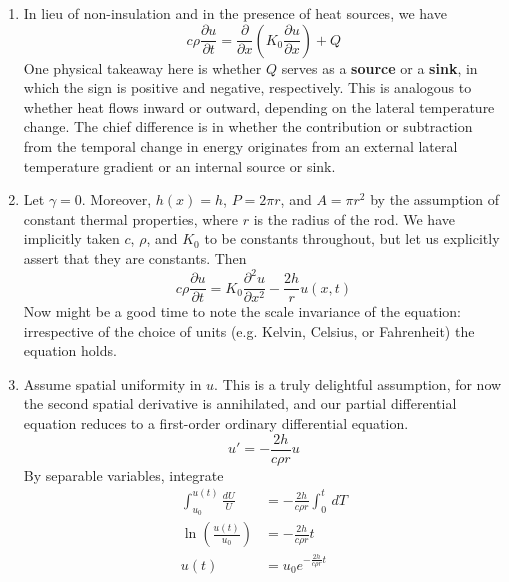 \documentclass[a4paper]{article}
\begin{document}
\begin{enumerate}[label=(\alph*)]
	\[
		c \rho \frac{\partial u}{\partial t} = \frac{\partial }{\partial x}\!\left( K_{0} \frac{\partial u}{\partial x} \right) - \frac{P}{A}\!\left[ u \!\left( x,t \right) - \gamma \!\left( x,t \right) \right]h \!\left( x \right) 
	\]
	Since \( h \!\left( x \right) \) is positive, we need not worry about dealing with sign alterations on that last term. Physically, suppose that \( u > \gamma \). Then the outside temperature is cooler, so heat transfer is in the opposite direction of the temperature gradient (from the rod to the outside), hence the final term is negative. In the converse direction when \( u < \gamma \), heat flows from the outside to the rod, and the final term is positive. At equality, the final term vanishes, and whether or not the lateral surface area is insulated becomes irrelevant in this special case.
	\item In lieu of non-insulation and in the presence of heat sources, we have
	\[
		c \rho \frac{\partial u}{\partial t} = \frac{\partial }{\partial x}\!\left( K_{0}\frac{\partial u}{\partial x} \right) + Q 
	\]
	One physical takeaway here is whether \( Q \) serves as a \textbf{source} or a \textbf{sink}, in which the sign is positive and negative, respectively. This is analogous to whether heat flows inward or outward, depending on the lateral temperature change. The chief difference is in whether the contribution or subtraction from the temporal change in energy originates from an external lateral temperature gradient or an internal source or sink.
	\item Let \( \gamma = 0 \). Moreover, \( h \!\left( x \right) = h \), \( P = 2 \pi r \), and \( A = \pi r^{2} \) by the assumption of constant thermal properties, where \( r \) is the radius of the rod. We have implicitly taken \( c \), \( \rho \), and \( K_{0} \) to be constants throughout, but let us explicitly assert that they are constants. Then
	\[
		c \rho \frac{\partial u}{\partial t} = K_{0}\frac{\partial^{2}u}{\partial x^{2}} - \frac{2h}{r}u \!\left( x,t \right)
	\]
	Now might be a good time to note the scale invariance of the equation: irrespective of the choice of units (e.g. Kelvin, Celsius, or Fahrenheit) the equation holds.
	\item Assume spatial uniformity in \( u \). This is a truly delightful assumption, for now the second spatial derivative is annihilated, and our partial differential equation reduces to a first-order ordinary differential equation.
	\[
		u' = -\frac{2h}{c \rho r}u 
	\]
	By separable variables, integrate
	\begin{align*}
		\int^{u \!\left( t \right)}_{u_{0}} \frac{dU}{U} & = -\frac{2h}{c \rho r}\int^{t}_{0}  \, dT \\
		\ln\!\left(\frac{u \!\left( t \right)}{u_{0}}\right) & = -\frac{2h}{c \rho r}t \\
		u \!\left( t \right) & = u_{0}e^{-\frac{2h}{c \rho r}t}
	\end{align*}
\end{enumerate}
\end{document}
